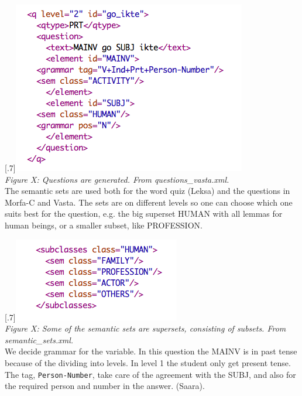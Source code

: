 \documentclass[a4paper,12pt]{article}
\begin{document}
\scalebox{.7}[.7]{\includegraphics{img/question_vasta.png}}\\
\textit{Figure X: Questions are generated. From questions\_vasta.xml.}\\

The semantic sets are used both for the word quiz (Leksa) and the questions in Morfa-C and Vasta. The sets are on different levels so one can choose which one suits best for the question, e.g. the big superset HUMAN with all lemmas for human beings, or a smaller subset, like PROFESSION. 

\scalebox{.7}[.7]{\includegraphics{img/semantic_set.png}}\\
\textit{Figure X: Some of the semantic sets are supersets, consisting of subsets. From semantic\_sets.xml.}\\

We decide grammar for the variable. In this question the MAINV is in past tense because of the dividing into levels. In level 1 the student only get present tense. The tag, \texttt{Person-Number}, take care of the agreement with the SUBJ, and also for the required person and number in the answer. (Saara).
\end{document}
